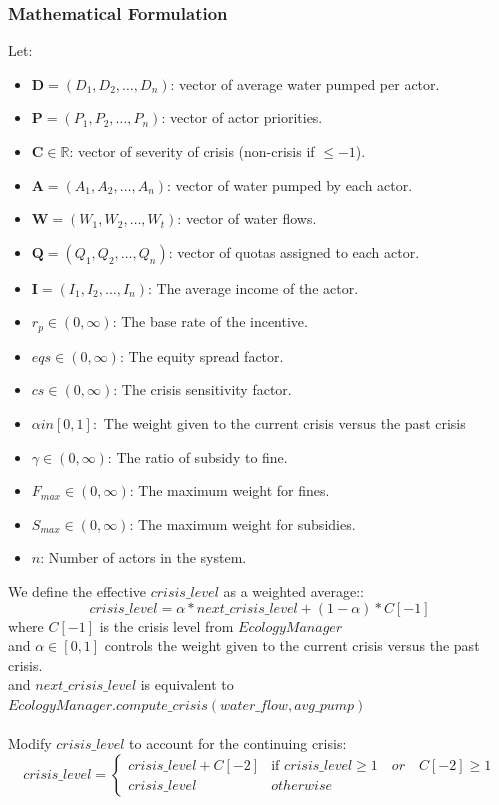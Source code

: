 \documentclass[ruler]{CUP-JNL-EDS}%
\begin{document}
\subsubsection{Mathematical Formulation}
Let:
\begin{itemize}
    \item $\mathbf{D} = (D_1, D_2, \dots, D_n)$: vector of average water pumped per actor.
    \item $\mathbf{P} = (P_1, P_2, \dots, P_n)$: vector of actor priorities.
    \item $\mathbf{C} \in \mathbb{R}$: vector of severity of crisis (non-crisis if $\leq -1$).
    \item $\mathbf{A} = (A_1, A_2, \dots, A_n)$: vector of water pumped by each actor.
    \item $\mathbf{W} = (W_1, W_2, \dots, W_t)$: vector of water flows.
    \item $\mathbf{Q} = (Q_1, Q_2, \dots, Q_n)$: vector of quotas assigned to each actor.
    \item $\mathbf{I} = (I_1, I_2, \dots, I_n)$: The average income of the actor.
    \item ${r_p} \in (0,\infty)$: The base rate of the incentive.
    \item $eqs \in (0, \infty)$: The equity spread factor.
    \item $cs \in (0, \infty)$: The crisis sensitivity factor.
    \item $\alpha in [0, 1]:$ The weight given to the current crisis versus the past crisis
    \item $\gamma \in (0, \infty)$: The ratio of subsidy to fine.
    \item $F_{max} \in (0, \infty)$: The maximum weight for fines.
    \item $S_{max} \in (0, \infty)$: The maximum weight for subsidies.
    \item \(n\): Number of actors in the system.
\end{itemize}

\noindent We define the effective $crisis\_level$ as a weighted average::
\[
crisis\_level = \alpha * next\_crisis\_level + (1 - \alpha) * C[-1]
\]
where \(C[-1]\) is the crisis level from $EcologyManager$ \\
\quad and \(\alpha \in [0,1]\) controls the weight given to the current crisis versus the past crisis.\\
\quad and  $next\_crisis\_level$ is equivalent to $EcologyManager.compute\_crisis(water\_flow, avg\_pump)$
\\ \\ 
Modify $crisis\_level$ to account for the continuing crisis:
\[
crisis\_level = \begin{cases}crisis\_level + C[-2] & \text{if }crisis\_level \geq 1 \quad or \quad C[-2] \geq 1 \\
    crisis\_level & otherwise
\end{cases}
\]
\\
\end{document}

